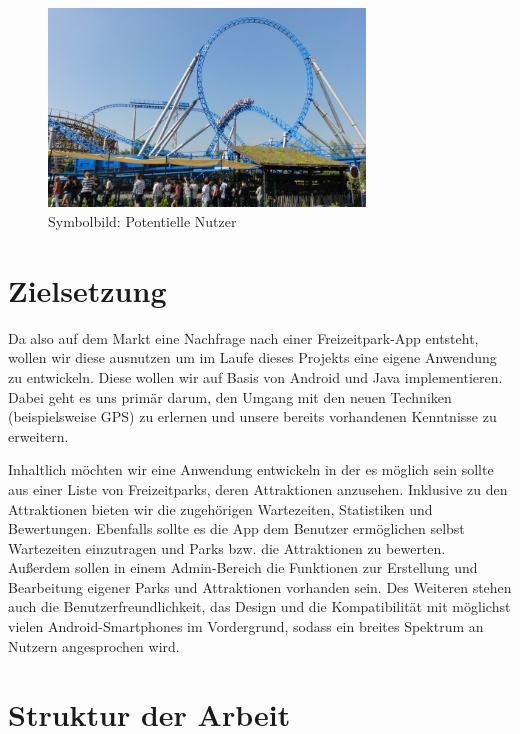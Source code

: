 \begin{figure}[htp]
	\centering
  	\includegraphics[width=0.75\textwidth]{img/motivation/bluefire.jpg}
	\caption[Blue Fire Achterbahn]{Symbolbild: Potentielle Nutzer\footnotemark}
	\label{figure:bluefire}
\end{figure}

\section{Zielsetzung}
\label{sec:einleitung:zielsetzung}

Da also auf dem Markt eine Nachfrage nach einer Freizeitpark-App entsteht, wollen wir diese ausnutzen um im Laufe dieses Projekts eine eigene Anwendung zu entwickeln. Diese wollen wir auf Basis von Android und Java implementieren. Dabei geht es uns primär darum, den Umgang mit den neuen Techniken (beispielsweise GPS) zu erlernen und unsere bereits vorhandenen Kenntnisse zu erweitern. 

Inhaltlich möchten wir eine Anwendung entwickeln in der es möglich sein sollte aus einer Liste von Freizeitparks, deren Attraktionen anzusehen. Inklusive zu den Attraktionen bieten wir die zugehörigen Wartezeiten, Statistiken und Bewertungen. 
Ebenfalls sollte es die App dem Benutzer ermöglichen selbst Wartezeiten einzutragen und Parks bzw. die Attraktionen zu bewerten.
Außerdem sollen in einem Admin-Bereich die Funktionen zur Erstellung und Bearbeitung eigener Parks und Attraktionen vorhanden sein.
Des Weiteren stehen auch die Benutzerfreundlichkeit, das Design und die Kompatibilität mit möglichst vielen Android-Smartphones im Vordergrund, sodass ein breites Spektrum an Nutzern angesprochen wird. 

\section{Struktur der Arbeit}
\label{sec:einleitung:struktur}

